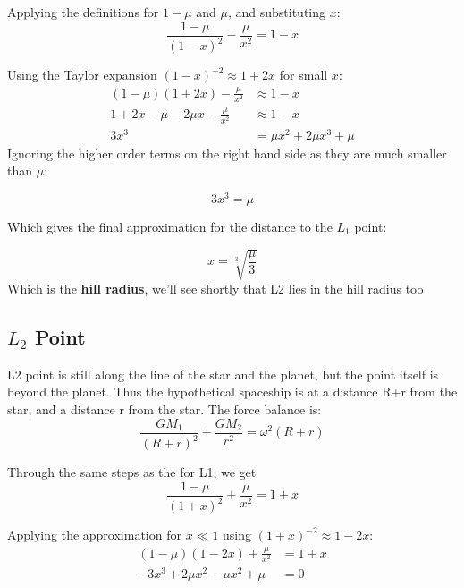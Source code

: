 \documentclass[10pt, a4paper]{article}
\begin{document}
Applying the definitions for $1-\mu$ and $\mu$, and substituting $x$:
\begin{equation*}
\frac{1-\mu}{(1-x)^2} - \frac{\mu}{x^2} = 1 - x
\end{equation*}

Using the Taylor expansion $(1-x)^{-2} \approx 1 + 2x$ for small $x$:
\begin{align*}
    (1-\mu)(1+2x) - \frac{\mu}{x^2} &\approx 1 - x \\
    1 + 2x - \mu - 2\mu x - \frac{\mu}{x^2} &\approx 1 - x \\
    3x^3 &= \mu x^2 + 2\mu x^3 + \mu
\end{align*}
Ignoring the higher order terms on the right hand side  as they are much smaller than $\mu$:

\begin{equation*}
    3x^3 = \mu
\end{equation*}

Which gives the final approximation for the distance to the $L_1$ point:

\begin{equation*}
    x = \sqrt[3]{\frac{\mu}{3}}
\end{equation*}
Which is the \textbf{hill radius}, we'll see shortly that L2 lies in the hill radius too

\subsection*{$L_2$ Point}

L2 point is still along the line of the star and the planet, but the point itself is beyond the planet. Thus the hypothetical spaceship is at a distance R+r from the star, and a distance r from the star. The force balance is:
\begin{equation*}
\frac{G M_1}{(R+r)^2} + \frac{G M_2}{r^2} = \omega^2 (R + r)
\end{equation*}

Through the same steps as the for L1, we get
\begin{equation*}
    \frac{1-\mu}{(1+x)^2} + \frac{\mu}{x^2} = 1 + x
\end{equation*}

Applying the approximation for $x \ll 1$ using $(1+x)^{-2} \approx 1 - 2x$:
\begin{align*}
    (1-\mu)(1-2x) + \frac{\mu}{x^2} &= 1 + x \\
   -3x^3 + 2\mu x^2 - \mu x^2 + \mu &= 0
\end{align*}
\end{document}
